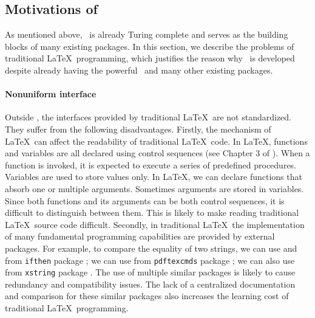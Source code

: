 \documentclass{ltugboat}
\begin{document}
\subsection{Motivations of \liii}
As mentioned above, \LaTeXe~is already Turing complete and serves as the building blocks of many existing packages. In this section, we describe the problems of traditional \LaTeX~programming, which justifies the reason why \liii~is developed despite already having the powerful \LaTeXe~and many other existing packages.
\paragraph{Nonuniform interface} 
Outside \liii, the interfaces provided by traditional \LaTeX~are not standardized. They suffer from the following disadvantages.
Firstly, the mechanism of \LaTeX~can affect the readability of traditional \LaTeX~code. 
In \LaTeX, functions and variables are all declared using control sequences (see Chapter 3 of \cite{knuth1984texbook}).
When a function is invoked, it is expected to execute a series of predefined procedures. Variables are used to store values only.
In \LaTeX, we can declare functions that absorb one or multiple arguments.
Sometimes arguments are stored in variables.
Since both functions and its arguments can be both control sequences, it is difficult to distinguish between them. 
This is likely to make reading traditional \LaTeX\ source code difficult.
Secondly, in traditional \LaTeX~the implementation of many fundamental programming capabilities are provided by external packages.
For example, to compare the equality of two strings, we can use  and  from \verb|ifthen| package \cite{pkg:ifthen};
we can use  from \verb|pdftexcmds| package \cite{pkg:pdftexcmds};
we can also use  from \verb|xstring| package \cite{pkg:xstring}. 
The use of multiple similar packages is likely to cause redundancy and compatibility issues.
The lack of a centralized documentation and comparison for these similar packages also increases the learning cost of traditional \LaTeX\ programming.
\end{document}
